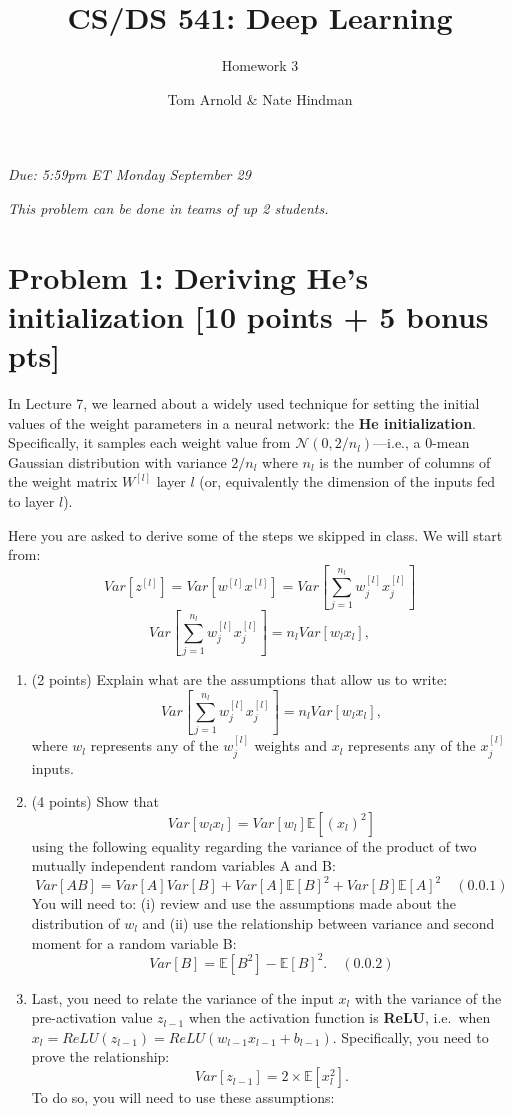 \documentclass[
  letterpaper,
  DIV=11,
  numbers=noendperiod]{scrartcl}
\title{CS/DS 541: Deep Learning}
\subtitle{Homework 3}
\author{Tom Arnold \& Nate Hindman}
\date{}
\begin{document}
\maketitle



\emph{Due: 5:59pm ET Monday September 29}

\emph{This problem can be done in teams of up 2 students.}

\section{Problem 1: Deriving He's initialization {[}10 points + 5 bonus
pts{]}}\label{problem-1-deriving-hes-initialization-10-points-5-bonus-pts}

In Lecture 7, we learned about a widely used technique for setting the
initial values of the weight parameters in a neural network: the
\textbf{He initialization}. Specifically, it samples each weight value
from \(\mathcal{N}(0,2/n_{l})\)---i.e., a 0-mean Gaussian distribution
with variance \(2/n_{l}\) where \(n_{l}\) is the number of columns of
the weight matrix \(W^{[l]}\) layer \(l\) (or, equivalently the
dimension of the inputs fed to layer \(l\)).

Here you are asked to derive some of the steps we skipped in class. We
will start from:
\[Var[z^{[l]}]=Var[w^{[l]}x^{[l]}]=Var[\sum_{j=1}^{n_{l}}w_{j}^{[l]}x_{j}^{[l]}]\]
\[Var[\sum_{j=1}^{n_{l}}w_{j}^{[l]}x_{j}^{[l]}]=n_{l}Var[w_{l}x_{l}],\]

\begin{enumerate}
\def\labelenumi{\arabic{enumi}.}
\item
  (2 points) Explain what are the assumptions that allow us to write:
  \[Var[\sum_{j=1}^{n_{l}}w_{j}^{[l]}x_{j}^{[l]}]=n_{l}Var[w_{l}x_{l}],\]
  where \(w_{l}\) represents any of the \(w_{j}^{[l]}\) weights and
  \(x_{l}\) represents any of the \(x_{j}^{[l]}\) inputs.
\item
  (4 points) Show that
  \[Var[w_{l}x_{l}]=Var[w_{l}]\mathbb{E}[(x_{l})^{2}]\]using the
  following equality regarding the variance of the product of two
  mutually independent random variables A and
  B:\[Var[AB]=Var[A]Var[B]+Var[A]\mathbb{E}[B]^{2}+Var[B]\mathbb{E}[A]^{2} \quad (0.0.1)\]You
  will need to: (i) review and use the assumptions made about the
  distribution of \(w_{l}\) and (ii) use the relationship between
  variance and second moment for a random variable
  B:\[Var[B]=\mathbb{E}[B^{2}]-\mathbb{E}[B]^{2}. \quad (0.0.2)\]
\item
  Last, you need to relate the variance of the input \(x_{l}\) with the
  variance of the pre-activation value \(z_{l-1}\) when the activation
  function is \textbf{ReLU}, i.e.~when
  \(x_{l}=ReLU(z_{l-1})=ReLU(w_{l-1}x_{l-1}+b_{l-1})\). Specifically,
  you need to prove the relationship:
  \[Var[z_{l-1}]=2\times\mathbb{E}[x_{l}^{2}].\] To do so, you will need
  to use these assumptions:
\end{enumerate}
\end{document}
